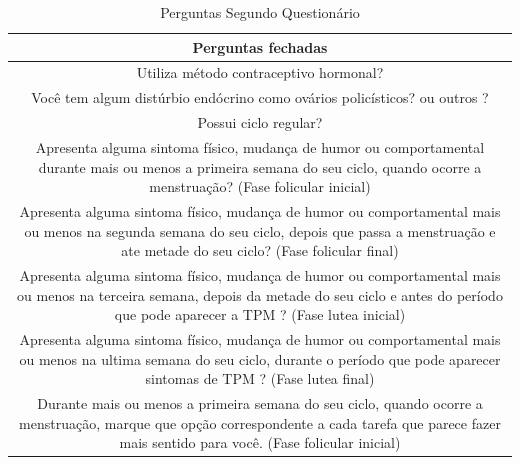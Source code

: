 \begin{table}[ht]
    \centering
    \caption{Perguntas Segundo Questionário}
    \label{tab09}
    \begin{tabular}{c}
        \toprule
        \textbf{Perguntas fechadas} \\
        \midrule
        \begin{minipage} [t] {1\textwidth} Utiliza método contraceptivo hormonal?  \end{minipage} \\
        \midrule
        \begin{minipage} [t] {1\textwidth} Você tem algum distúrbio endócrino como ovários policísticos? ou outros ? \end{minipage}\\
        \midrule
        \begin{minipage} [t] {1\textwidth} Possui ciclo regular? \end{minipage} \\
        \midrule
        \begin{minipage} [t] {1\textwidth} Apresenta alguma sintoma físico, mudança de humor ou comportamental durante mais ou menos a primeira semana do seu ciclo, quando ocorre a menstruação? (Fase folicular inicial) \end{minipage}  \\
        \midrule
        \begin{minipage} [t] {1\textwidth} Apresenta alguma sintoma físico, mudança de humor ou comportamental mais ou menos na segunda semana do seu ciclo, depois que passa a menstruação e ate metade do seu ciclo? (Fase folicular final)\end{minipage}\\
        \midrule
        \begin{minipage} [t] {1\textwidth} Apresenta alguma sintoma físico, mudança de humor ou comportamental mais ou menos na terceira semana, depois da metade do seu ciclo e antes do período que pode aparecer a TPM ? (Fase lutea inicial)\end{minipage} \\
        \midrule
        \begin{minipage} [t] {1\textwidth} Apresenta alguma sintoma físico, mudança de humor ou comportamental mais ou menos na ultima semana do seu ciclo, durante o período que pode aparecer sintomas de TPM ? (Fase lutea final)\end{minipage}\\
        \midrule
        \begin{minipage} [t] {1\textwidth} Durante mais ou menos a primeira semana do seu ciclo, quando ocorre a menstruação, marque que opção correspondente a cada tarefa que parece fazer mais sentido para você. (Fase folicular inicial) \end{minipage}\\

\end{tabular}
\end{table}
